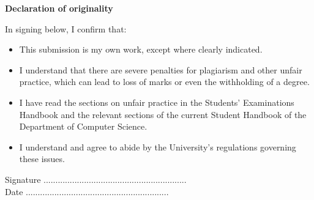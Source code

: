 \thispagestyle{empty}

\begin{center}
    {\LARGE\bf Declaration of originality}
\end{center}

In signing below, I confirm that:

\begin{itemize}
\item{This submission is my own work, except where clearly
indicated.  }

\item{I understand that there are severe penalties for plagiarism 
and other unfair practice, which can lead to loss of marks
or even the withholding of a degree. }
 
\item{I have read the sections on unfair practice in the Students' 
Examinations Handbook and the relevant sections of the 
current Student Handbook of the Department of Computer 
Science.}
 
\item{I understand and agree to abide by the University's
regulations governing these issues.}
\end{itemize}

\vspace{3em}
Signature ............................................................  \\

\vspace{1em}
Date ............................................................ \\

%
%
%
